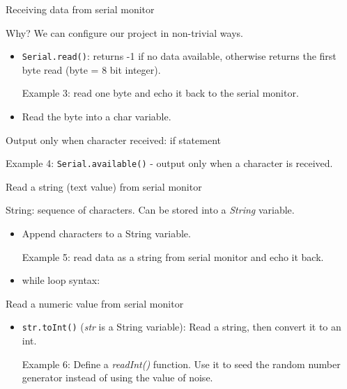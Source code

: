 \documentclass[aspectratio=1610]{beamer}
\begin{document}

\begin{frame}[plain,t]{Receiving data from serial monitor}

Why? We can configure our project in non-trivial ways. 

\begin{itemize}
\item \lstinline$Serial.read()$: returns -1 if no data available, otherwise
returns the first byte read (byte = 8 bit integer).

\smallskip
Example 3: read one byte and echo it back to the serial monitor. 

\vspace*{.2\textheight}
\item Read the byte into a char variable. 

\end{itemize}
\end{frame}


\begin{frame}[plain,t]{Output only when character received: if
    statement}


\vfill
Example 4: \lstinline$Serial.available()$ - output only when a
character is received.

\end{frame}




\begin{frame}[plain,t]{Read a string (text value) from serial monitor}

String: sequence of characters. Can be stored into a \emph{String}
variable.

\bigskip
\begin{itemize}
\item Append characters to a String variable.

\smallskip
Example 5: read data as a string from serial monitor and echo it back.

\smallskip
\item while loop syntax:
\end{itemize}
\end{frame}



\begin{frame}[plain,t]{Read a numeric value from serial monitor}

\begin{itemize}
\item \lstinline$str.toInt()$ (\emph{str} is a String variable): Read
  a string, then convert it to an int.

\smallskip
Example 6: Define a \emph{readInt()} function. Use it to seed the
random number generator instead of using the value of noise.
\end{itemize}

\end{frame}
\end{document}
